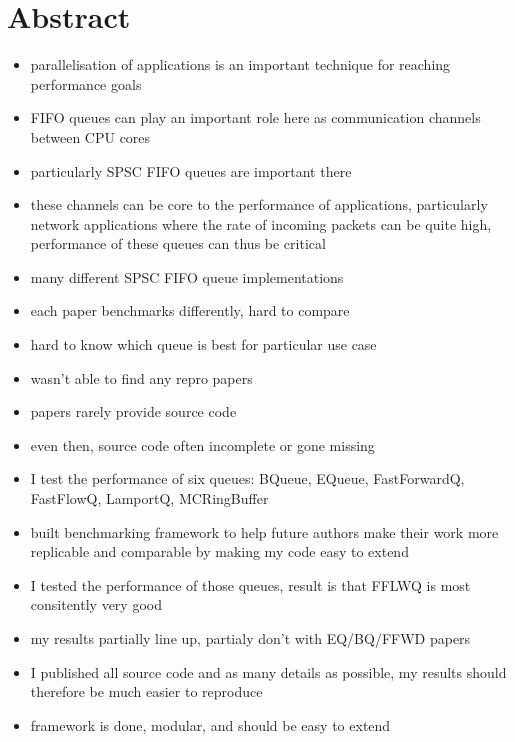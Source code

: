 \section*{Abstract}
\begin{itemize}
    \item parallelisation of applications is an important technique for reaching performance goals
    \item FIFO queues can play an important role here as communication channels between CPU cores
    \item particularly SPSC FIFO queues are important there
    \item these channels can be core to the performance of applications, particularly network applications
        where the rate of incoming packets can be quite high, performance of these queues can thus be critical
    \item many different SPSC FIFO queue implementations
    \item each paper benchmarks differently, hard to compare
    \item hard to know which queue is best for particular use case
    \item wasn't able to find any repro papers
    \item papers rarely provide source code
    \item even then, source code often incomplete or gone missing
    \item I test the performance of six queues: BQueue, EQueue, FastForwardQ, FastFlowQ, LamportQ, MCRingBuffer
    \item built benchmarking framework to help future authors make their work more replicable and comparable
        by making my code easy to extend
    \item I tested the performance of those queues, result is that FFLWQ is most consitently very good
    \item my results partially line up, partialy don't with EQ/BQ/FFWD papers
    \item I published all source code and as many details as possible, my results should therefore be much easier to reproduce
    \item framework is done, modular, and should be easy to extend
\end{itemize}
